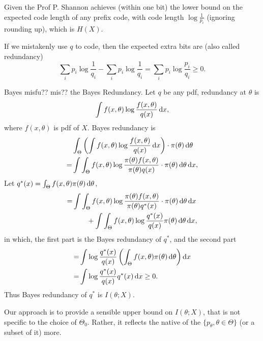 Given the Prof P. Shannon achieves (within one bit) the lower bound on the expected code length of any prefix code, with code length \(\log\frac{1}{p_{i}}\) (ignoring rounding up), which is \(H(X)\).

If we mistakenly use \(q\) to code, then the expected extra bits are (also called redundancy)
\begin{equation}
	\sum_{i}p_{i}\log\frac{1}{q_{i}}-\sum_{i}p_{i}\log\frac{1}{q_{i}}=\sum_{i}p_{i}\log\frac{p_{i}}{q_{i}}\geq 0.
\end{equation}

Bayes misfu?? mis?? the Bayes Redundancy. Let \(q\) be any pdf, redundancy at \(\theta\) is
\begin{equation}
	\int f(x,\theta)\log\frac{f(x,\theta)}{q(x)}\mathop{}\!\mathrm{d} x,
\end{equation}
where \(f(x,\theta)\) is pdf of \(X\). Bayes redundancy is
\begin{equation}
	\begin{aligned}
		  & \int_{\Theta}\left(\int f(x,\theta)\log\frac{f(x,\theta)}{q(x)}\mathop{}\!\mathrm{d} x\right)\cdot\pi(\theta)\mathop{}\!\mathrm{d}\theta          \\
		= & \int\int_{\Theta}f(x,\theta)\log\frac{\pi(\theta)f(x,\theta)}{\pi(\theta)q(x)}\cdot\pi(\theta)\mathop{}\!\mathrm{d}\theta\mathop{}\!\mathrm{d} x,
	\end{aligned}
\end{equation}
Let \(q^{*}(x)=\int_{\Theta}f(x,\theta)\pi(\theta)\mathop{}\!\mathrm{d}\theta\),
\begin{equation}
	\begin{aligned}
		= & \int\int_{\Theta}f(x,\theta)\log\frac{\pi(\theta)f(x,\theta)}{\pi(\theta)q^{*}(x)}\cdot\pi(\theta)\mathop{}\!\mathrm{d}\theta\mathop{}\!\mathrm{d} x \\
		  & \qquad+\int\int_{\Theta}f(x,\theta)\log\frac{q^{*}(x)}{q(x)}\pi(\theta)\mathop{}\!\mathrm{d}\theta\mathop{}\!\mathrm{d} x,
	\end{aligned}
\end{equation}
in which, the first part is the Bayes redundancy of \(q^{*}\), and the second part
\begin{equation}
	\begin{aligned}
		= & \int\log\frac{q^{*}(x)}{q(x)}\left(\int_{\Theta}f(x,\theta)\pi(\theta)\mathop{}\!\mathrm{d}\theta\right)\mathop{}\!\mathrm{d} x \\
		= & \int\log\frac{q^{*}(x)}{q(x)}q^{*}(x)\mathop{}\!\mathrm{d} x\geq 0.
	\end{aligned}
\end{equation}
Thus Bayes redundancy of \(q^{*}\) is \(I\left(\theta;X\right)\).

Our approach is to provide a sensible upper bound on \(I\left(\theta; X\right)\), that is not specific to the choice of \(\Theta_{0}\). Rather, it reflects the native of the \(\{p_{\theta},\theta\in\Theta\}\) (or a subset of it) more.

